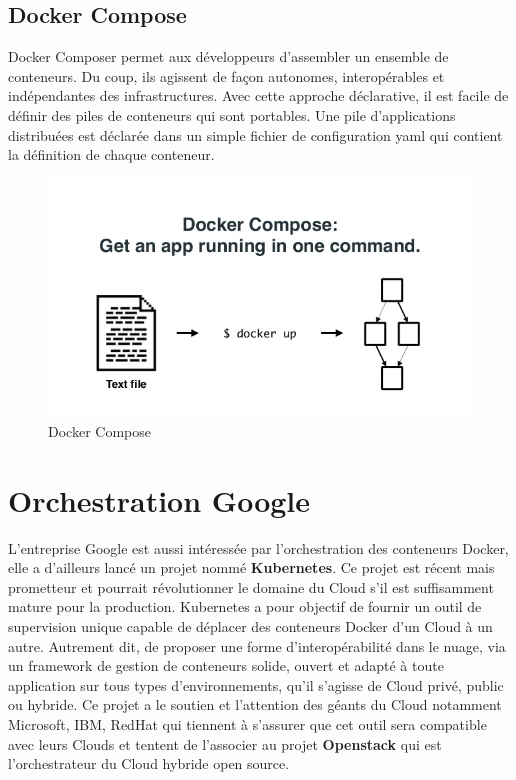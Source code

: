 \begin{onehalfspace}
\subsection*{Docker Compose}
  Docker Composer permet aux développeurs d'assembler un ensemble de conteneurs. Du coup, ils agissent de façon autonomes, interopérables et indépendantes des infrastructures. Avec cette approche déclarative, il est facile de définir des piles de conteneurs qui sont portables. Une pile d'applications distribuées est déclarée dans un simple fichier de configuration \acrshort{yaml} qui contient la définition de chaque conteneur.
\begin{figure}[H]
\centering
\includegraphics [scale=0.5]{chapitre3/assets/dockercompose.jpg}
\caption{Docker Compose \cite{docker-compose}}
\end{figure}
\section{Orchestration Google}


L'entreprise Google est aussi intéressée par l'orchestration des conteneurs Docker, elle a d'ailleurs lancé un projet nommé \textbf{Kubernetes}. Ce projet est récent mais prometteur et pourrait révolutionner le domaine du Cloud s'il est suffisamment mature pour la production. Kubernetes a pour objectif de fournir un outil de supervision unique capable de déplacer des conteneurs Docker d'un Cloud à un autre. Autrement dit, de proposer une forme d'interopérabilité dans le nuage, via un framework de gestion de conteneurs solide, ouvert et adapté à toute application sur tous types d'environnements, qu'il s'agisse de Cloud privé, public ou hybride. Ce projet a le soutien et l'attention des géants du Cloud notamment Microsoft, IBM, RedHat qui tiennent à s'assurer que cet outil sera compatible avec leurs Clouds et tentent de l'associer au projet \textbf{Openstack} qui est l'orchestrateur du Cloud hybride open source.

\end{onehalfspace}
